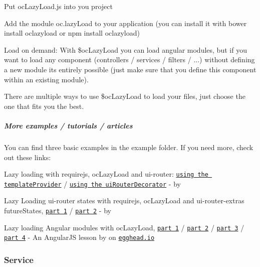 \begin{DoxyItemize}
\item Put oc\+Lazy\+Load.\+js into you project
\item Add the module {\ttfamily oc.\+lazy\+Load} to your application (you can install it with {\ttfamily bower install oclazyload} or {\ttfamily npm install oclazyload})
\item Load on demand\+: With \$oc\+Lazy\+Load you can load angular modules, but if you want to load any component (controllers / services / filters / ...) without defining a new module it\textquotesingle{}s entirely possible (just make sure that you define this component within an existing module).
\end{DoxyItemize}

There are multiple ways to use {\ttfamily \$oc\+Lazy\+Load} to load your files, just choose the one that fits you the best.

\subparagraph*{More examples / tutorials / articles}

You can find three basic examples in the example folder. If you need more, check out these links\+:
\begin{DoxyItemize}
\item Lazy loading with requirejs, oc\+Lazy\+Load and ui-\/router\+: \href{http://plnkr.co/edit/OGvi01?p=preview}{\tt using the template\+Provider} / \href{http://plnkr.co/edit/6CLDsz?p=preview}{\tt using the ui\+Router\+Decorator} -\/ by 
\item Lazy Loading ui-\/router states with requirejs, oc\+Lazy\+Load and ui-\/router-\/extras future\+States, \href{http://bardo.io/posts/oclazyload-future-states/}{\tt part 1} / \href{http://bardo.io/posts/ng-deferred-bootstrap-like-with-oclazyload/}{\tt part 2} -\/ by 
\item Lazy loading Angular modules with oc\+Lazy\+Load, \href{https://egghead.io/lessons/angularjs-lazy-loading-angular-modules-with-oclazyload}{\tt part 1} / \href{https://egghead.io/lessons/angularjs-lazy-loading-modules-with-ui-router-and-oclazyload}{\tt part 2} / \href{https://egghead.io/lessons/angularjs-simple-lazy-loaded-angular-module-syntax-with-oclazyload}{\tt part 3} / \href{https://egghead.io/lessons/angularjs-lazy-loading-non-angular-libraries-with-oclazyload}{\tt part 4} -\/ An Angular\+JS lesson by \href{https://twitter.com/johnlindquist}{\tt } on \href{https://egghead.io/}{\tt egghead.\+io}
\end{DoxyItemize}

\subsubsection*{Service}

